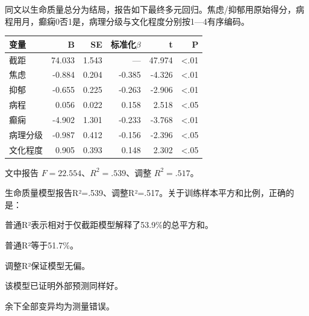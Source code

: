 同文以生命质量总分为结局，报告如下最终多元回归。焦虑/抑郁用原始得分，病程用月，癫痫0否1是，病理分级与文化程度分别按1---4有序编码。

\begin{center}\small\setlength{\tabcolsep}{3.5pt}\renewcommand{\arraystretch}{1.18}\begin{tabular}{@{}lrrrrr@{}}
\toprule
变量 & B & SE & 标准化\(\beta\) & t & P \\
\midrule

截距 & 74.033 & 1.543 & --- & 47.974 & \textless.01 \\
焦虑 & -0.884 & 0.204 & -0.385 & -4.326 & \textless.01 \\
抑郁 & -0.655 & 0.225 & -0.263 & -2.906 & \textless.01 \\
病程 & 0.056 & 0.022 & 0.158 & 2.518 & \textless.05 \\
癫痫 & -4.902 & 1.301 & -0.233 & -3.768 & \textless.01 \\
病理分级 & -0.987 & 0.412 & -0.156 & -2.396 & \textless.05 \\
文化程度 & 0.905 & 0.393 & 0.148 & 2.302 & \textless.05 \\
\bottomrule\end{tabular}\end{center}

文中报告 \(F=22.554\)、\(R^2=.539\)、调整 \(R^2=.517\)。


\par\addvspace{6pt}\noindent\begin{minipage}{\linewidth}


生命质量模型报告R²=.539、调整R²=.517。关于训练样本平方和比例，正确的是：


\begin{choices}

\item 普通R²表示相对于仅截距模型解释了53.9\%的总平方和。

\item 普通R²等于51.7\%。

\item 调整R²保证模型无偏。

\item 该模型已证明外部预测同样好。

\item 余下全部变异均为测量错误。

\end{choices}

\end{minipage}\par\vspace{4pt}

